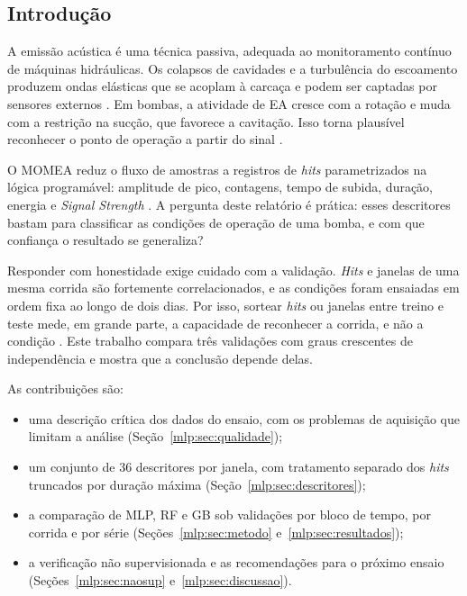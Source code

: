 \subsection{Introdução}
\label{mlp:sec:introducao}

A emissão acústica é uma técnica passiva, adequada ao monitoramento contínuo de máquinas hidráulicas. Os colapsos de cavidades e a turbulência do escoamento produzem ondas elásticas que se acoplam à carcaça e podem ser captadas por sensores externos \cite{brennen1995,Neill1997Detection,Alfayez2005ndt}. Em bombas, a atividade de EA cresce com a rotação e muda com a restrição na sucção, que favorece a cavitação. Isso torna plausível reconhecer o ponto de operação a partir do sinal \cite{Neill1997Detection,Alfayez2005ndt,derakhshan1991}.

O MOMEA reduz o fluxo de amostras a registros de \textit{hits} parametrizados na lógica programável: amplitude de pico, contagens, tempo de subida, duração, energia e \textit{Signal Strength} \cite{unnthorsson2013,vallen2022}. A pergunta deste relatório é prática: esses descritores bastam para classificar as condições de operação de uma bomba, e com que confiança o resultado se generaliza?

Responder com honestidade exige cuidado com a validação. \textit{Hits} e janelas de uma mesma corrida são fortemente correlacionados, e as condições foram ensaiadas em ordem fixa ao longo de dois dias. Por isso, sortear \textit{hits} ou janelas entre treino e teste mede, em grande parte, a capacidade de reconhecer a corrida, e não a condição \cite{kaufman2012,roberts2017}. Este trabalho compara três validações com graus crescentes de independência e mostra que a conclusão depende delas.

As contribuições são:
\begin{itemize}
	\item uma descrição crítica dos dados do ensaio, com os problemas de aquisição que limitam a análise (Seção~\ref{mlp:sec:qualidade});
	\item um conjunto de 36 descritores por janela, com tratamento separado dos \textit{hits} truncados por duração máxima (Seção~\ref{mlp:sec:descritores});
	\item a comparação de MLP, RF e GB sob validações por bloco de tempo, por corrida e por série (Seções~\ref{mlp:sec:metodo} e~\ref{mlp:sec:resultados});
	\item a verificação não supervisionada e as recomendações para o próximo ensaio (Seções~\ref{mlp:sec:naosup} e~\ref{mlp:sec:discussao}).
\end{itemize}

